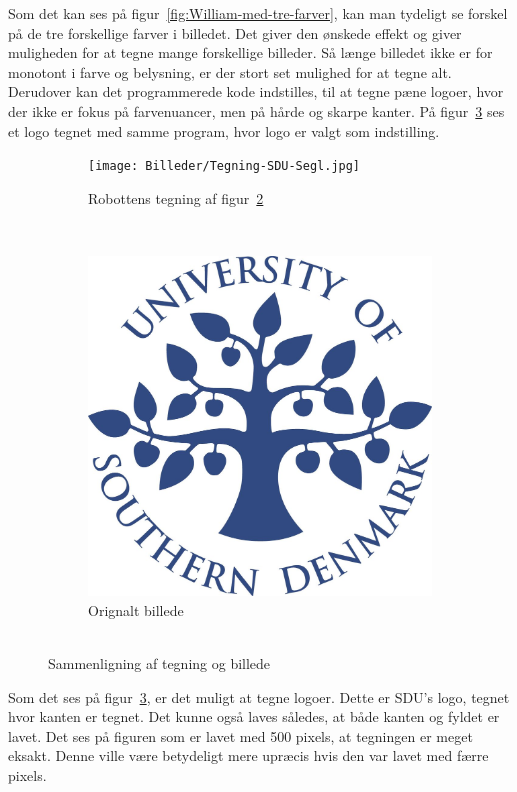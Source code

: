 Som det kan ses på figur~\ref{fig:William-med-tre-farver}, kan man tydeligt se forskel på de tre forskellige farver i billedet. Det giver den ønskede effekt og giver muligheden for at tegne mange forskellige billeder. Så længe billedet ikke er for monotont i farve og belysning, er der stort set mulighed for at tegne alt. Derudover kan det programmerede kode indstilles, til at tegne pæne logoer, hvor der ikke er fokus på farvenuancer, men på hårde og skarpe kanter. På figur~\ref{fig:Segl-SDU} ses et logo tegnet med samme program, hvor logo er valgt som indstilling.

\begin{figure}[h]
        \centering
        	\begin{subfigure}[b]{0.3\textwidth}
                	\texttt{[image: Billeder/Tegning-SDU-Segl.jpg]}
               		\caption[caption]{Robottens tegning af figur~\ref{fig:Bedst-Segl-SDU-Original}}
            	    \label{fig:Bedst-Segl-SDU}
       		\end{subfigure}
       		\quad%
        ~ %
       		\begin{subfigure}[b]{0.3\textwidth}
                	\includegraphics[scale=0.45]{Billeder/Segl-SDU.jpg}
            	    \caption[caption]{Orignalt billede\\
            		\ }
          	      \label{fig:Bedst-Segl-SDU-Original}
        	\end{subfigure}
        	\caption[caption]{Sammenligning af tegning og billede}
        	\label{fig:Segl-SDU}
\end{figure}


Som det ses på figur~\ref{fig:Segl-SDU}, er det muligt at tegne logoer. Dette er SDU's logo, tegnet hvor kanten er tegnet. Det kunne også laves således, at både kanten og fyldet er lavet. Det ses på figuren som er lavet med 500 pixels, at tegningen er meget eksakt. Denne ville være betydeligt mere upræcis hvis den var lavet med færre pixels.